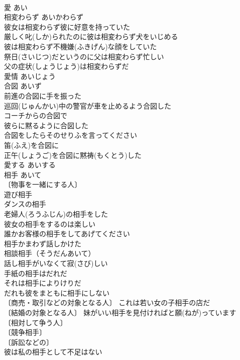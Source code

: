 \documentclass[8pt]{extreport}
\begin{document}
\begin{CJK}{UTF8}{min}
\\	愛	あい	
\\	相変わらず	あいかわらず	
\\	彼女は相変わらず彼に好意を持っていた 
\\	厳しく叱(しか)られたのに彼は相変わらず犬をいじめる 
\\	彼は相変わらず不機嫌(ふきげん)な顔をしていた 
\\	祭日(さいじつ)だというのに父は相変わらず忙しい 
\\	父の症状(しょうじょう)は相変わらずだ 
\\	愛情	あいじょう	
\\	合図	あいず	
\\	前進の合図に手を振った 
\\	巡回(じゅんかい)中の警官が車を止めるよう合図した 
\\	コーチからの合図で 
\\	彼らに黙るように合図した 
\\	合図をしたらそのせりふを言ってください 
\\	笛(ふえ)を合図に 
\\	正午(しょうご)を合図に黙祷(もくとう)した 
\\	愛する	あいする	
\\	相手	あいて	
\\	〔物事を一緒にする人〕
\\	遊び相手 
\\	ダンスの相手 
\\	老婦人(ろうふじん)の相手をした 
\\	彼女の相手をするのは楽しい 
\\	誰かお客様の相手をしてあげてください 
\\	相手かまわず話しかけた 
\\	相談相手（そうだんあいて） 
\\	話し相手がいなくて寂(さび)しい 
\\	手紙の相手はだれだ 
\\	それは相手によりけりだ 
\\	だれも彼をまともに相手にしない 
\\	〔商売・取引などの対象となる人〕 これは若い女の子相手の店だ 
\\	〔結婚の対象となる人〕 妹がいい相手を見付ければと願(ねが)っています 
\\	〔相対して争う人〕
\\	〔競争相手〕
\\	〔訴訟などの〕
\\	彼は私の相手として不足はない 

\end{CJK}
\end{document}
